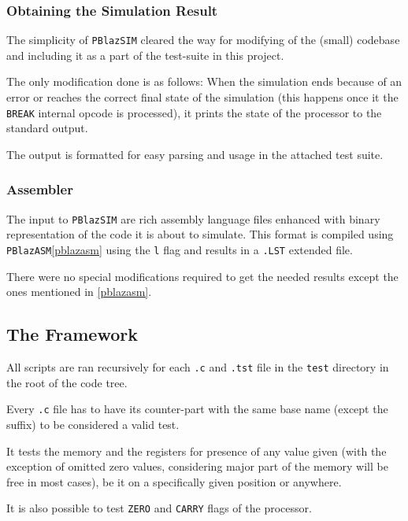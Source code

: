             \subsubsection{Obtaining the Simulation Result}

                The simplicity of \texttt{PBlazSIM} cleared the way for modifying of the (small) codebase and including it as a part of the test-suite in this project.

                The only modification done is as follows: When the simulation ends because of an error or reaches the correct final state of the simulation (this happens once it  the \texttt{BREAK} internal opcode is processed), it prints the state of the processor to the standard output.

                The output is formatted for easy parsing and usage in the attached test suite.

            \subsubsection{Assembler}

                The input to \texttt{PBlazSIM} are rich assembly language files enhanced with binary representation of the code it is about to simulate. This format is compiled using \texttt{PBlazASM}\ref{pblazasm} using the \texttt{\-l} flag and results in a \texttt{.LST} extended file.

                There were no special modifications required to get the needed results except the ones mentioned in \ref{pblazasm}.

        \subsection{The Framework}

        All scripts are ran recursively for each \texttt{.c} and \texttt{.tst} file in the \texttt{test} directory in the root of the code tree.

        Every \texttt{.c} file has to have its counter-part with the same base name (except the suffix) to be considered a valid test.

        It tests the memory and the registers for presence of any value given (with the exception of omitted zero values, considering major part of the memory will be free in most cases), be it on a specifically given position or anywhere.

        It is also possible to test \texttt{ZERO} and \texttt{CARRY} flags of the processor.

